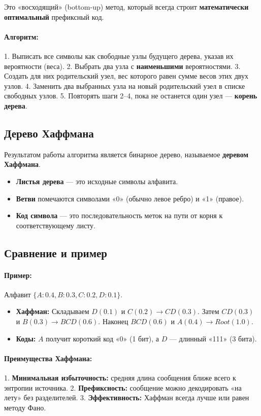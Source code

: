 Это «восходящий» (bottom-up) метод, который всегда строит \textbf{математически оптимальный} префиксный код.

\paragraph{Алгоритм:}
1. Выписать все символы как свободные узлы будущего дерева, указав их вероятности (веса).
2. Выбрать два узла с \textbf{наименьшими} вероятностями.
3. Создать для них родительский узел, вес которого равен сумме весов этих двух узлов.
4. Заменить два выбранных узла на новый родительский узел в списке свободных узлов.
5. Повторять шаги 2–4, пока не останется один узел — \textbf{корень дерева}.

\subsection*{Дерево Хаффмана}

Результатом работы алгоритма является бинарное дерево, называемое \textbf{деревом Хаффмана}.
\begin{itemize}
    \item \textbf{Листья дерева} — это исходные символы алфавита.
    \item \textbf{Ветви} помечаются символами «0» (обычно левое ребро) и «1» (правое).
    \item \textbf{Код символа} — это последовательность меток на пути от корня к соответствующему листу.
\end{itemize}

\subsection*{Сравнение и пример}

\paragraph{Пример:} Алфавит $\{A: 0.4, B: 0.3, C: 0.2, D: 0.1\}$.
\begin{itemize}
    \item \textbf{Хаффман:} Складываем $D(0.1)$ и $C(0.2) \to CD(0.3)$. Затем $CD(0.3)$ и $B(0.3) \to BCD(0.6)$. Наконец $BCD(0.6)$ и $A(0.4) \to Root(1.0)$.
    \item \textbf{Коды:} $A$ получит короткий код «0» (1 бит), а $D$ — длинный «111» (3 бита).
\end{itemize}

\paragraph{Преимущества Хаффмана:}
1. \textbf{Минимальная избыточность:} средняя длина сообщения ближе всего к энтропии источника.
2. \textbf{Префиксность:} сообщение можно декодировать «на лету» без разделителей.
3. \textbf{Эффективность:} Хаффман всегда лучше или равен методу Фано.